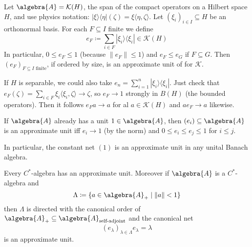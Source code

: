 \documentclass[a4paper]{article}
\begin{document}
\begin{example}
	Let $\algebra{A} = \mathcal{K}(H)$, the span of the compact operators on a Hilbert space $H$, and use physics notation: $|\xi \rangle \langle \eta|(\zeta) = \xi \langle \eta, \zeta\rangle$. 
	Let $(\xi_i)_{i \in I} \subseteq H$ be an orthonormal basis.
	For each $F \subseteq I$ finite we define
	\begin{equation*}
		e_F \coloneq \sum_{i \in F} | \xi_i \rangle \langle \xi_i | \in \mathcal{K}(H)
	\end{equation*}
	In particular, $0 \leq e_F \leq 1$ (because $\|e_F\| \leq 1$) and $e_F \leq e_G$ if $F \subseteq G$.
	Then $(e_F)_{F \subseteq I \text{ finite}}$, if ordered by size, is an approximate unit of for $\mathcal{K}$.

	If $H$ is separable, we could also take $e_n = \sum_{i = 1}^n | \xi_i \rangle \langle \xi_i |$.
	Just check that $e_F(\zeta) = \sum_{i \in F} \xi_i \langle  \xi_i, \zeta \rangle \to \zeta$, so $e_F \to 1$ strongly in $B(H)$ (the bounded operators).
	Then it follows $e_F a \to a$ for al $a \in \mathcal{K}(H)$ and $a e_F \to a$ likewise.
\end{example}

\begin{remark}
	If $\algebra{A}$ already has a unit $1 \in \algebra{A}$, then $(e_i) \subseteq \algebra{A}$ is an approximate unit iff $e_i \to 1$ (by the norm) and $0 \leq e_i \leq e_j \leq 1$ for $i \leq j$.

	In particular, the constant net $(1)$ is an approximate unit in any unital Banach algebra.
\end{remark}

\begin{theorem}
	Every $C^*$-algebra has an approximate unit. Moreover if $\algebra{A}$ is a $C^*$-algebra and
	\begin{equation*}
		\Lambda \coloneq \{a \in \algebra{A}_+ \mid \|a\| < 1\}
	\end{equation*}
	then $\Lambda$ is directed with the canonical order of $\algebra{A}_+ \subseteq \algebra{A}_{\text{self-adjoint}}$ and the canonical net 
	\begin{equation*}
		(e_\lambda)_{\lambda \in \Lambda} e_\lambda = \lambda
	\end{equation*}
	is an approximate unit.
\end{theorem}
\end{document}
